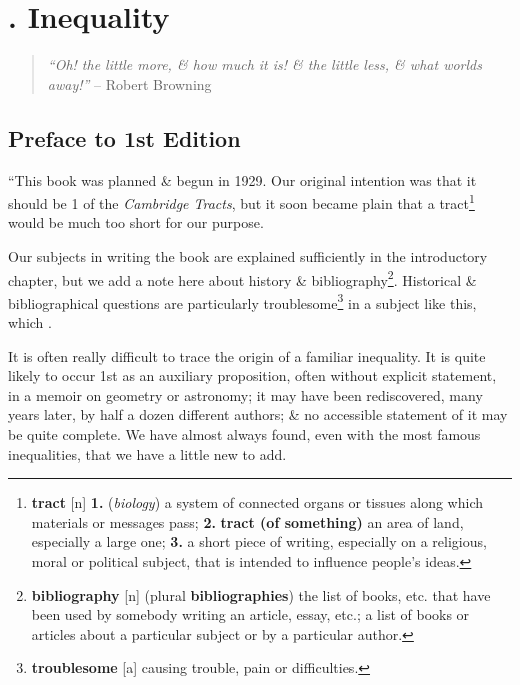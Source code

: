 \documentclass[oneside]{book}
\numberwithin{equation}{section}
\begin{document}

\chapter{\cite{Hardy_Littlewood_Polya1952}. Inequality}

\begin{quotation}
	\textit{``Oh! the little more, \& how much it is! \& the little less, \& what worlds away!''} -- Robert Browning
\end{quotation}

\section*{Preface to 1st Edition}
``This book was planned \& begun in 1929. Our original intention was that it should be 1 of the \textit{Cambridge Tracts}, but it soon became plain that a tract\footnote{\textbf{tract} [n] \textbf{1.} (\textit{biology}) a system of connected organs or tissues along which materials or messages pass; \textbf{2.} \textbf{tract (of something)} an area of land, especially a large one; \textbf{3.} a short piece of writing, especially on a religious, moral or political subject, that is intended to influence people's ideas.} would be much too short for our purpose.

Our subjects in writing the book are explained sufficiently in the introductory chapter, but we add a note here about history \& bibliography\footnote{\textbf{bibliography} [n] (plural \textbf{bibliographies}) the list of books, etc. that have been used by somebody writing an article, essay, etc.; a list of books or articles about a particular subject or by a particular author.}. Historical \& bibliographical questions are particularly troublesome\footnote{\textbf{troublesome} [a] causing trouble, pain or difficulties.} in a subject like this, which .

It is often really difficult to trace the origin of a familiar inequality. It is quite likely to occur 1st as an auxiliary proposition, often without explicit statement, in a memoir on geometry or astronomy; it may have been rediscovered, many years later, by half a dozen different authors; \& no accessible statement of it may be quite complete. We have almost always found, even with the most famous inequalities, that we have a little new to add.
\end{document}

